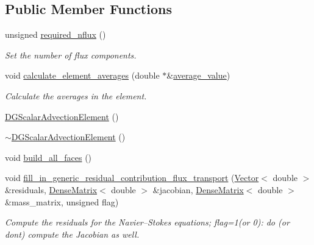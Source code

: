 \subsection*{Public Member Functions}
\begin{DoxyCompactItemize}
\item 
unsigned \hyperlink{classoomph_1_1DGScalarAdvectionElement_3_012_00_01NNODE__1D_01_4_a316a94ee11fe6fe52e25a2eec1b4a1c8}{required\+\_\+nflux} ()
\begin{DoxyCompactList}\small\item\em Set the number of flux components. \end{DoxyCompactList}\item 
void \hyperlink{classoomph_1_1DGScalarAdvectionElement_3_012_00_01NNODE__1D_01_4_a929abefd370881945240338a03265d99}{calculate\+\_\+element\+\_\+averages} (double $\ast$\&\hyperlink{classoomph_1_1DGElement_a9349e3c349f9cf3b25bcb6121e86a7f2}{average\+\_\+value})
\begin{DoxyCompactList}\small\item\em Calculate the averages in the element. \end{DoxyCompactList}\item 
\hyperlink{classoomph_1_1DGScalarAdvectionElement_3_012_00_01NNODE__1D_01_4_a9c47cf7c2c926c1b23a0d5a02ee3b5b9}{D\+G\+Scalar\+Advection\+Element} ()
\item 
\hyperlink{classoomph_1_1DGScalarAdvectionElement_3_012_00_01NNODE__1D_01_4_a3685f199c4487a78ed548943ab32337e}{$\sim$\+D\+G\+Scalar\+Advection\+Element} ()
\item 
void \hyperlink{classoomph_1_1DGScalarAdvectionElement_3_012_00_01NNODE__1D_01_4_a467b719ab6fd88aaddade7e32a0cf354}{build\+\_\+all\+\_\+faces} ()
\item 
void \hyperlink{classoomph_1_1DGScalarAdvectionElement_3_012_00_01NNODE__1D_01_4_a2c33e2b2f4e41b504d77bd86881f0869}{fill\+\_\+in\+\_\+generic\+\_\+residual\+\_\+contribution\+\_\+flux\+\_\+transport} (\hyperlink{classoomph_1_1Vector}{Vector}$<$ double $>$ \&residuals, \hyperlink{classoomph_1_1DenseMatrix}{Dense\+Matrix}$<$ double $>$ \&jacobian, \hyperlink{classoomph_1_1DenseMatrix}{Dense\+Matrix}$<$ double $>$ \&mass\+\_\+matrix, unsigned flag)
\begin{DoxyCompactList}\small\item\em Compute the residuals for the Navier--Stokes equations; flag=1(or 0)\+: do (or don\textquotesingle{}t) compute the Jacobian as well. \end{DoxyCompactList}\end{DoxyCompactItemize}
